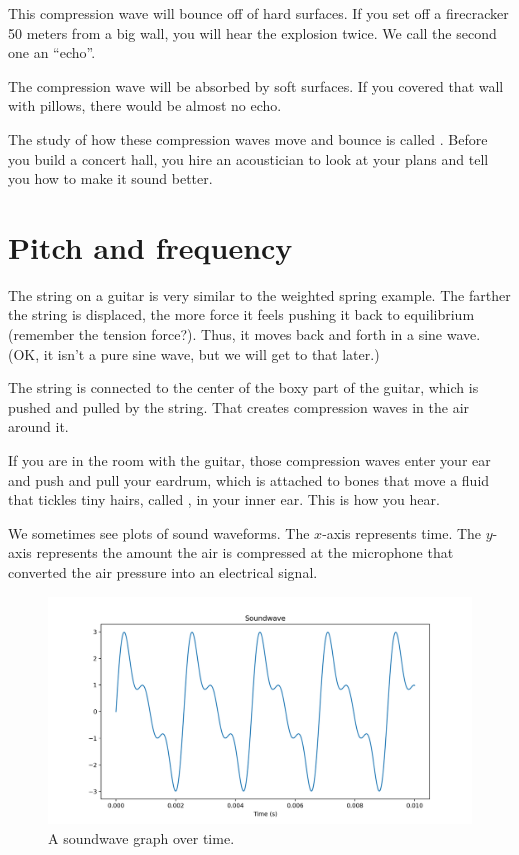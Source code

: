 This compression wave will bounce off of hard surfaces. If you set off
a firecracker 50 meters from a big wall, you will hear the explosion
twice. We call the second one an ``echo''.

The compression wave will be absorbed by soft surfaces. If you covered
that wall with pillows, there would be almost no echo.

The study of how these compression waves move and bounce is called
. Before you build a concert hall, you hire an
acoustician to look at your plans and tell you how to make it sound
better.

\section{Pitch and frequency}

The string on a guitar is very similar to the weighted spring
example. The farther the string is displaced, the more force it feels
pushing it back to equilibrium (remember the tension force?). Thus, it moves back and forth in a
sine wave. (OK, it isn't a pure sine wave, but we will get to that later.)

The string is connected to the center of the boxy part of the guitar,
which is pushed and pulled by the string. That creates compression
waves in the air around it.

If you are in the room with the guitar, those compression waves enter
your ear and push and pull your eardrum, which is attached to bones that
move a fluid that tickles tiny hairs, called , in your
inner ear. This is how you hear.

We sometimes see plots of sound waveforms.  The $x$-axis represents
time. The $y$-axis represents the amount the air is compressed at the
microphone that converted the air pressure into an electrical signal.
\begin{figure}[htbp]
    \centering
    \includegraphics[width=0.8\linewidth]{soundwave.png}
    \caption{A soundwave graph over time.}
    \label{fig:soundwave}
\end{figure}

